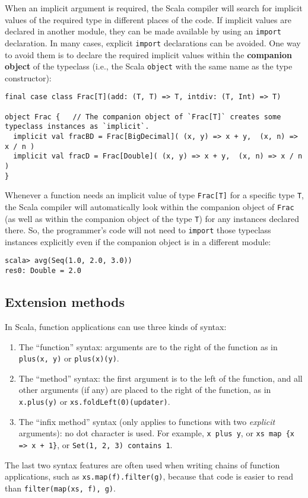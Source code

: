 When an implicit argument is required, the Scala compiler will search
for implicit values of the required type in different places of the
code. If implicit values are declared in another module, they can
be made available by using an \lstinline!import! declaration. In
many cases, explicit \lstinline!import! declarations can be avoided.
One way to avoid them is to declare the required implicit values within
the \textbf{companion object} of the typeclass
(i.e., the Scala \lstinline!object! with the same name as the type
constructor):
\begin{lstlisting}
final case class Frac[T](add: (T, T) => T, intdiv: (T, Int) => T)

object Frac {   // The companion object of `Frac[T]` creates some typeclass instances as `implicit`.
  implicit val fracBD = Frac[BigDecimal]( (x, y) => x + y,  (x, n) => x / n )
  implicit val fracD = Frac[Double]( (x, y) => x + y,  (x, n) => x / n )
}
\end{lstlisting}
Whenever a function needs an implicit value of type \lstinline!Frac[T]!
for a specific type \lstinline!T!, the Scala compiler will automatically
look within the companion object of \lstinline!Frac! (as well as
within the companion object of the type \lstinline!T!) for any instances
declared there. So, the programmer\textsf{'}s code will not need to \lstinline!import!
those typeclass instances explicitly even if the companion object
is in a different module:
\begin{lstlisting}
scala> avg(Seq(1.0, 2.0, 3.0))
res0: Double = 2.0
\end{lstlisting}


\subsection{Extension methods}

In Scala, function applications can use three kinds of syntax: 
\begin{enumerate}
\item The \textsf{``}function\textsf{''} syntax: arguments are to the right of the function
as in \lstinline!plus(x, y)! or \lstinline!plus(x)(y)!.
\item The \textsf{``}method\textsf{''} syntax: the first argument is to the left of the
function, and all other arguments (if any) are placed to the right
of the function, as in \lstinline!x.plus(y)! or \lstinline!xs.foldLeft(0)(updater)!.
\item The \textsf{``}infix method\textsf{''} syntax (only applies to functions with two
\emph{explicit} arguments): no dot character is used. For example,
\lstinline!x plus y!, or \lstinline!xs map {x => x + 1}!, or \lstinline!Set(1, 2, 3) contains 1!.
\end{enumerate}
The last two syntax features are often used when writing chains of
function applications, such as \lstinline!xs.map(f).filter(g)!, because
that code is easier to read than \lstinline!filter(map(xs, f), g)!. 


